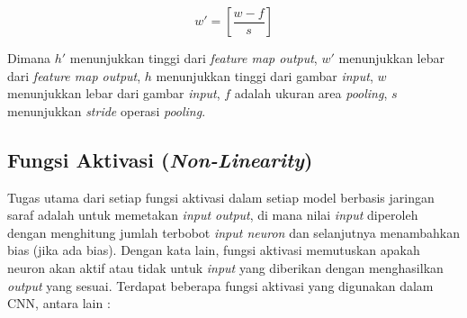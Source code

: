 \begin{equation}
	w'= \left[ \frac{w-f}{s} \right]
\end{equation}

Dimana $h'$ menunjukkan tinggi dari \textit{feature map output}, $w'$ menunjukkan lebar dari \textit{feature map output}, $h$ menunjukkan tinggi dari gambar \textit{input}, $w$ menunjukkan lebar dari gambar \textit{input}, $f$ adalah ukuran area \textit{pooling}, $s$ menunjukkan \textit{stride} operasi \textit{pooling}.

\subsection{Fungsi Aktivasi (\textit{Non-Linearity})}
\label{subsec:fungsi-aktivasi}

Tugas utama dari setiap fungsi aktivasi dalam setiap model berbasis jaringan saraf adalah untuk memetakan \textit{input output}, di mana nilai \textit{input} diperoleh dengan menghitung jumlah terbobot \textit{input neuron} dan selanjutnya menambahkan bias (jika ada bias). Dengan kata lain, fungsi aktivasi memutuskan apakah neuron akan aktif atau tidak untuk \textit{input} yang diberikan dengan menghasilkan \textit{output} yang sesuai. Terdapat beberapa fungsi aktivasi yang digunakan dalam CNN, antara lain :

